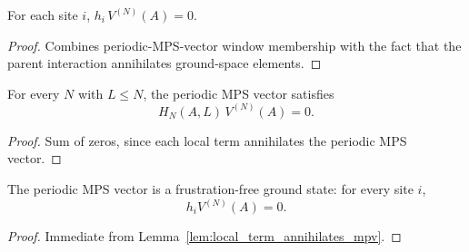 \begin{lemma}\label{lem:local_term_annihilates_mpv}
    \leanok
    For each site $i$, $h_i\,V^{(N)}(A) = 0$.
\end{lemma}

\begin{proof}
    \leanok
    Combines periodic-MPS-vector window membership with the fact that the parent
    interaction annihilates ground-space elements.
\end{proof}

\begin{lemma}\label{lem:parent_hamiltonian_annihilates}
    \leanok
    For every $N$ with $L\le N$, the periodic MPS vector satisfies
    \[
        H_N(A,L)\,V^{(N)}(A) = 0.
    \]
\end{lemma}

\begin{proof}
    \leanok
    Sum of zeros, since each local term annihilates the periodic MPS vector.
\end{proof}

\begin{lemma}\label{lem:parent_hamiltonian_ff}
    \leanok
    The periodic MPS vector is a frustration-free ground state: for every site $i$,
    \[
        h_i V^{(N)}(A)=0.
    \]
\end{lemma}

\begin{proof}
    \leanok
    Immediate from Lemma~\ref{lem:local_term_annihilates_mpv}.
\end{proof}
